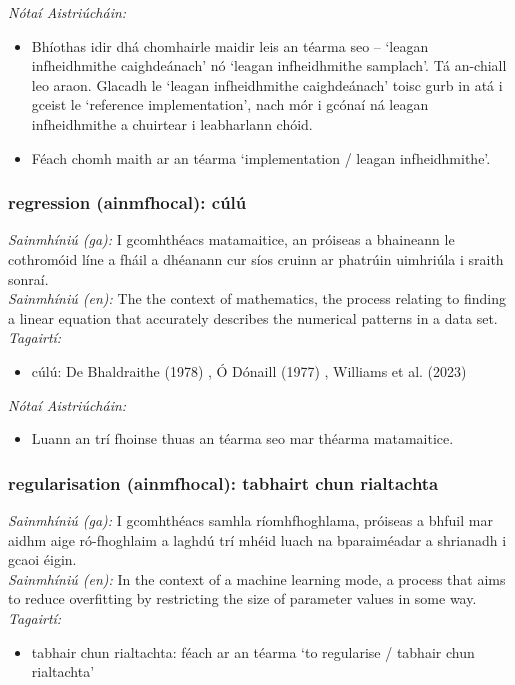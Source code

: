  \noindent \textit{Nótaí Aistriúcháin:}
\begin{itemize}
	\item Bhíothas idir dhá chomhairle maidir leis an téarma seo -- `leagan infheidhmithe caighdeánach' nó `leagan infheidhmithe samplach'. Tá an-chiall leo araon. Glacadh le `leagan infheidhmithe caighdeánach' toisc gurb in atá i gceist le `reference implementation', nach mór i gcónaí ná leagan infheidhmithe a chuirtear i leabharlann chóid.
	\item Féach chomh maith ar an téarma `implementation / leagan infheidhmithe'.
\end{itemize}


\subsubsection*{regression (ainmfhocal): cúlú}
 \noindent \textit{Sainmhíniú (ga):} I gcomhthéacs matamaitice, an próiseas a bhaineann le cothromóid líne a fháil a dhéanann cur síos cruinn ar phatrúin uimhriúla i sraith sonraí.
\\
 \noindent \textit{Sainmhíniú (en):} The the context of mathematics, the process relating to finding a linear equation that accurately describes the numerical patterns in a data set.
\\
 \noindent \textit{Tagairtí:}
\begin{itemize}
	\item cúlú: De Bhaldraithe (1978) \cite{de-bhaldraithe}, Ó Dónaill (1977) \cite{odonaill}, Williams et al. (2023) \cite{storchiste}
\end{itemize}

 \noindent \textit{Nótaí Aistriúcháin:}
\begin{itemize}
	\item Luann an trí fhoinse thuas an téarma seo mar théarma matamaitice.
\end{itemize}


\subsubsection*{regularisation (ainmfhocal): tabhairt chun rialtachta}
 \noindent \textit{Sainmhíniú (ga):} I gcomhthéacs samhla ríomhfhoghlama, próiseas a bhfuil mar aidhm aige ró-fhoghlaim a laghdú trí mhéid luach na bparaiméadar a shrianadh i gcaoi éigin.
\\
 \noindent \textit{Sainmhíniú (en):} In the context of a machine learning mode, a process that aims to reduce overfitting by restricting the size of parameter values in some way.
\\
 \noindent \textit{Tagairtí:}
\begin{itemize}
	\item tabhair chun rialtachta: féach ar an téarma `to regularise / tabhair chun rialtachta'
\end{itemize}

